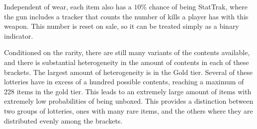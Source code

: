\documentclass[12pt]{paper}
\begin{document}
Independent of wear, each item
also has a $10\%$ chance of being StatTrak\texttrademark, where the
gun includes a tracker that counts the number of kills a player has
with this weapon. This number is reset on sale, so it can be treated
simply as a binary indicator.

Conditioned on the rarity, there are still many variants of the
contents available, and there is substantial heterogeneity in the
amount of contents in each of these brackets. The largest amount of
heterogeneity is in the Gold tier.  Several of these lotteries have in
excess of a hundred possible contents, reaching a maximum of 228 items
in the gold tier. This leads to an extremely large amount of items
with extremely low probabilities of being unboxed. This provides a
distinction between two groups of lotteries, ones with many rare
items, and the others where they are distributed evenly among the
brackets.
\end{document}
